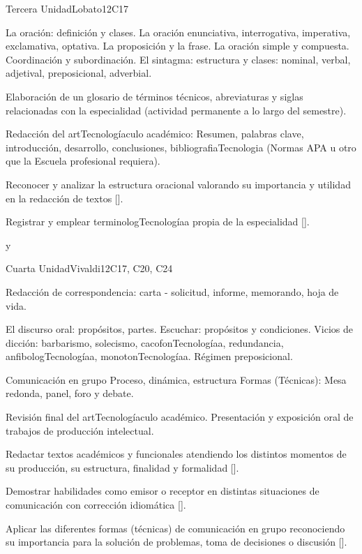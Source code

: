 \begin{syllabus}
\begin{unit}{}{Tercera Unidad}{Lobato}{12}{C17}
\begin{topics}
   \item La oración: definición y clases. La oración enunciativa, interrogativa, imperativa, exclamativa, optativa. La proposición y la frase. La oración simple y compuesta. Coordinación y subordinación. El sintagma: estructura y clases: nominal, verbal, adjetival, preposicional, adverbial.
   \item Elaboración de un glosario de términos técnicos, abreviaturas y siglas relacionadas con la especialidad (actividad permanente a lo largo del semestre).
   \item Redacción del artTecnologíaculo académico: Resumen, palabras clave, introducción, desarrollo, conclusiones, bibliografiaTecnologia (Normas APA u otro que la Escuela profesional requiera).
\end{topics}
\begin{learningoutcomes}
   \item Reconocer y analizar  la estructura oracional valorando su importancia y utilidad en la redacción de textos [\Usage].
   \item Registrar y emplear terminologTecnologíaa propia de la especialidad [\Usage].
\end{learningoutcomes}
\end{unit}
y
\begin{unit}{}{Cuarta Unidad}{Vivaldi}{12}{C17, C20, C24}
\begin{topics}
   \item Redacción de correspondencia: carta - solicitud, informe, memorando, hoja de vida.
   \item El discurso oral: propósitos, partes. Escuchar: propósitos y condiciones. Vicios de dicción: barbarismo, solecismo, cacofonTecnologíaa, redundancia, anfibologTecnologíaa, monotonTecnologíaa. Régimen preposicional.
   \item Comunicación en grupo Proceso, dinámica, estructura Formas (Técnicas): Mesa redonda,  panel, foro y debate.
   \item Revisión final del artTecnologíaculo académico. Presentación y exposición oral de trabajos de producción intelectual.
\end{topics}
\begin{learningoutcomes}
   \item Redactar textos académicos y funcionales atendiendo los distintos momentos de su producción, su estructura, finalidad y formalidad [\Usage].
   \item Demostrar habilidades como emisor o receptor en distintas situaciones de comunicación con corrección idiomática [\Usage].
   \item Aplicar las diferentes formas (técnicas) de comunicación en grupo reconociendo su importancia para la solución de problemas, toma de decisiones o discusión [\Usage].
\end{learningoutcomes}
\end{unit}



\begin{coursebibliography}
\end{coursebibliography}

\end{syllabus}
